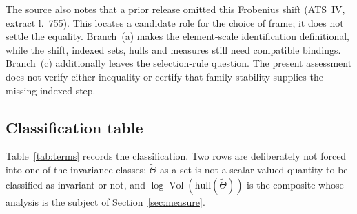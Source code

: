 \documentclass[11pt,a4paper]{article}
\theoremstyle{definition}
\theoremstyle{plain}
\theoremstyle{definition}
\newcommand{\Vol}{\operatorname{Vol}}
\newcommand{\Thet}{\widetilde{\Theta}}
\newcommand{\anchor}[2]{(#1, extract l.~#2)}
\begin{document}
The source also notes that a prior release omitted this Frobenius shift
\anchor{ATS~IV}{755}. This locates a candidate role for the choice of frame;
it does not settle the equality. Branch~(a) makes the element-scale
identification definitional, while the shift, indexed sets, hulls and measures
still need compatible bindings. Branch~(c) additionally leaves the
selection-rule question. The present assessment does not verify either
inequality or certify that family stability supplies the missing indexed step.

\subsection{Classification table}

Table~\ref{tab:terms} records the classification. Two rows are deliberately not
forced into one of the invariance classes: $\Thet$ as a set is not a
scalar-valued quantity to be classified as invariant or not, and
$\log \Vol(\mathrm{hull}(\Thet))$ is the composite whose analysis is the subject
of Section~\ref{sec:measure}.
\end{document}
